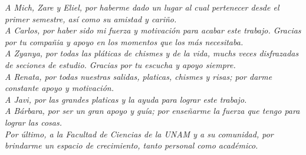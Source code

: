 \textit{A Mich, Zare y Eliel, por haberme dado un lugar al cual pertenecer desde
el primer semestre, as\'i como su amistad y cari\~{n}o.}\\

\textit{A Carlos, por haber sido mi fuerza y motivaci\'on para acabar este
trabajo. Gracias por tu compa\~{n}ia y apoyo en los momentos que los m\'as
necesitaba.}\\

\textit{A Zyanya, por todas las pl\'aticas de chismes y de la vida, muchs veces
disfrazadas de seciones de estudio. Gracias por tu escucha y apoyo siempre.}\\

\textit{A Renata, por todas nuestras salidas, platicas, chismes y risas; por
darme constante apoyo y motivaci\'on.}\\

\textit{A Javi, por las grandes platicas y la ayuda para lograr este trabajo.}\\

\textit{A B\'arbara, por ser un gran apoyo y gu\'ia; por ense\~{n}arme la fuerza
que tengo para lograr las cosas.}\\

\textit{Por \'ultimo, a la Facultad de Ciencias de la UNAM y a su comunidad, por
brindarme un espacio de crecimiento, tanto personal como acad\'emico.}